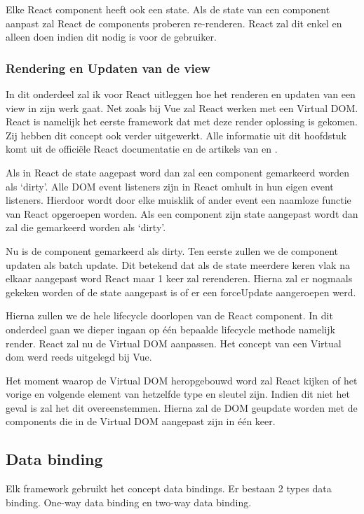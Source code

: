 
Elke React component heeft ook een state. Als de state van een component aanpast zal React de components proberen re-renderen. React zal dit enkel en alleen doen indien dit nodig is voor de gebruiker.

\subsubsection{Rendering en Updaten van de view}
\label{sec:React_Rendering_Updaten}
In dit onderdeel zal ik voor React uitleggen hoe het renderen en updaten van een view in zijn werk gaat. Net zoals bij Vue zal React werken met een Virtual DOM. React is namelijk het eerste framework dat met deze render oplossing is gekomen. Zij hebben dit concept ook verder uitgewerkt. Alle informatie uit dit hoofdstuk komt uit de officiële React documentatie \autocite{_react_2018} en de artikels van \textcite{mishra_hackernoon_2017} en \textcite{kurian_medium_2017}.

Als in React de state aagepast word dan zal een component gemarkeerd worden als ‘dirty’. Alle DOM event listeners zijn in React omhult in hun eigen event listeners. Hierdoor wordt door elke muisklik of ander event een naamloze functie van React opgeroepen worden. Als een component zijn state aangepast wordt dan zal die gemarkeerd worden als ‘dirty’.

Nu is de component gemarkeerd als dirty. Ten eerste zullen we de component updaten als batch update. Dit betekend dat als de state meerdere keren vlak na elkaar aangepast word React maar 1 keer zal rerenderen. Hierna zal er nogmaals gekeken worden of de state aangepast is of er een forceUpdate aangeroepen werd.

Hierna zullen we de hele lifecycle doorlopen van de React component. In dit onderdeel gaan we dieper ingaan op één bepaalde lifecycle methode namelijk render. React zal nu de Virtual DOM aanpassen. Het concept van een Virtual dom werd reeds uitgelegd bij Vue.

Het moment waarop de Virtual DOM heropgebouwd word zal React kijken of het vorige en volgende element van hetzelfde type en sleutel zijn. Indien dit niet het geval is zal het dit overeenstemmen. Hierna zal de DOM geupdate worden met de components die in de Virtual DOM aangepast zijn in één keer.

\subsection{Data binding}
\label{sec:Data_Binding}
Elk framework gebruikt het concept data bindings. Er bestaan 2 types data binding. One-way data binding en two-way data binding.

